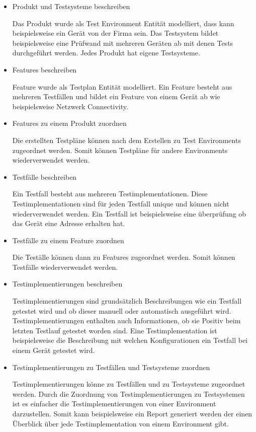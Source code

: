 \documentclass[a4paper, fontsize=11pt, parskip=half, twoside]{scrreprt}
\begin{document}
	\begin{itemize}
		\item Produkt und Testsysteme beschreiben
		
		Das Produkt wurde als Test Environment Entität modelliert, dass kann beispielsweise ein Gerät von der Firma sein.
		Das Testsystem bildet beispielsweise eine Prüfwand mit mehreren Geräten ab mit denen Tests durchgeführt werden.
		Jedes Produkt hat eigene Testsysteme.
		
		\item Features beschreiben
		
		Feature wurde als Testplan Entität modelliert.
		Ein Feature besteht aus mehreren Testfällen und bildet ein Feature von einem Gerät ab wie beispielsweise Netzwerk Connectivity.
		
		\item Features zu einem Produkt zuordnen
		
		Die erstellten Testpläne können nach dem Erstellen zu Test Environments zugeordnet werden.
		Somit können Testpläne für andere Environments wiederverwendet werden.
		
		\item Testfälle beschreiben
		
	    Ein Testfall besteht aus mehreren Testimplementationen.
	    Diese Testimplementationen sind für jeden Testfall unique und können nicht wiederverwendet werden. 
	    Ein Testfall ist beispielsweise eine überprüfung ob das Gerät eine  Adresse erhalten hat.
		
		\item Testfälle zu einem Feature zuordnen
		
		Die Teställe können dann zu Features zugeordnet werden.
		Somit können Testfälle wiederverwendet werden.
		
		\item Testimplementierungen beschreiben
		
		Testimplementierungen sind grundsätzlich Beschreibungen wie ein Testfall getestet wird und ob dieser manuell oder automatisch ausgeführt wird.
		Testimplementierungen enthalten auch Informationen, ob sie Positiv beim letzten Testlauf getestet worden sind.
		Eine Testimplementation ist beispielsweise die Beschreibung mit welchen Konfigurationen ein Testfall bei einem Gerät getestet wird.
		
		\item Testimplementierungen zu Testfällen und Testsysteme zuordnen
		
		Testimplementierungen könne zu Testfällen und zu Testsysteme zugeordnet werden.
		Durch die Zuordnung von Testimplementierungen zu Testsystemen ist es einfacher die Testimplementierungen von einer Environment darzustellen.
		Somit kann beispielsweise ein Report generiert werden der einen Überblick über jede Testimplementation von einem Environment gibt.
	\end{itemize}
\end{document}
